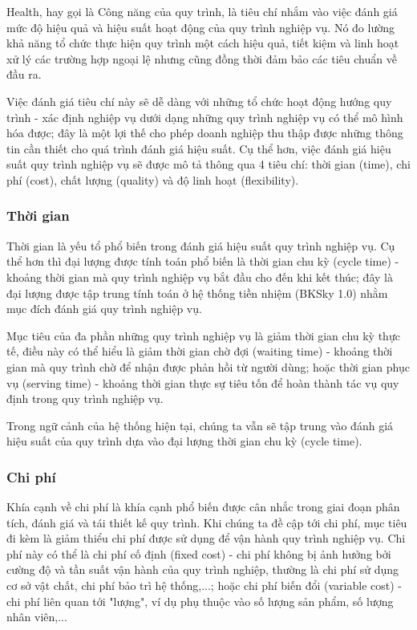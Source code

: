 Health, hay gọi là Công năng của quy trình, là tiêu chí nhắm vào việc đánh giá mức độ hiệu quả và hiệu suất hoạt động của quy trình nghiệp vụ. Nó đo lường khả năng tổ chức thực hiện quy trình một cách hiệu quả, tiết kiệm và linh hoạt xử lý các trường hợp ngoại lệ nhưng cũng đồng thời đảm bảo các tiêu chuẩn về đầu ra.

Việc đánh giá tiêu chí này sẽ dễ dàng với những tổ chức hoạt động hướng quy trình - xác định nghiệp vụ dưới dạng những quy trình nghiệp vụ có thể mô hình hóa được; đây là một lợi thế cho phép doanh nghiệp thu thập được những thông tin cần thiết cho quá trình đánh giá hiệu suất. Cụ thể hơn, việc đánh giá hiệu suất quy trình nghiệp vụ sẽ được mô tả thông qua 4 tiêu chí: thời gian (time), chi phí (cost), chất lượng (quality) và độ linh hoạt (flexibility).

\subsubsection{Thời gian}

Thời gian là yếu tổ phổ biến trong đánh giá hiệu suất quy trình nghiệp vụ. Cụ
thể hơn thì đại lượng được tính toán phổ biến là thời gian chu kỳ (cycle time)
- khoảng thời gian mà quy trình nghiệp vụ bắt đầu cho đến khi kết thúc; đây là
đại lượng được tập trung tính toán ở hệ thống tiền nhiệm (BKSky 1.0) nhằm mục
đích đánh giá quy trình nghiệp vụ.

Mục tiêu của đa phần những quy trình nghiệp vụ là giảm thời gian chu kỳ thực
tế, điều này có thể hiểu là giảm thời gian chờ đợi (waiting time) - khoảng thời
gian mà quy trình chờ để nhận được phản hồi từ người dùng; hoặc thời gian phục
vụ (serving time) - khoảng thời gian thực sự tiêu tốn để hoàn thành tác vụ quy
định trong quy trình nghiệp vụ.

Trong ngữ cảnh của hệ thống hiện tại, chúng ta vẫn sẽ tập trung vào đánh giá
hiệu suất của quy trình dựa vào đại lượng thời gian chu kỳ (cycle time).

\subsubsection{Chi phí}

Khía cạnh về chi phí là khía cạnh phổ biến được cân nhắc trong giai đoạn phân
tích, đánh giá và tái thiết kế quy trình. Khi chúng ta đề cập tới chi phí, mục
tiêu đi kèm là giảm thiểu chi phí được sử dụng để vận hành quy trình nghiệp vụ.
Chi phí này có thể là chi phí cố định (fixed cost) - chi phí không bị ảnh hưởng
bởi cường độ và tần suất vận hành của quy trình nghiệp, thường là chi phí sử
dụng cơ sở vật chất, chi phí bảo trì hệ thống,...; hoặc chi phí biến đổi
(variable cost) - chi phí liên quan tới "lượng", ví dụ phụ thuộc vào số lượng
sản phẩm, số lượng nhân viên,...


